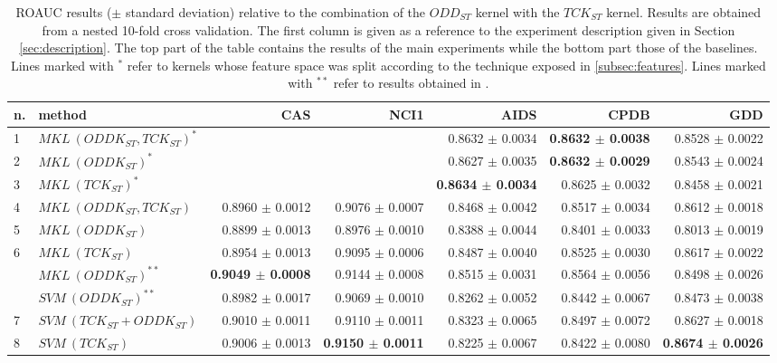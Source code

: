\begin{landscape}

    \begin{table}[ht]\footnotesize
        \centering
        \begin{tabular}{|l|l|r|r|r|r|r|}
            \hline
            n. &method&CAS&NCI1&AIDS&CPDB&GDD\\
            \hline
            1& $MKL~(ODDK_{ST}, TCK_{ST})^*$&&&0.8632 $\pm$ 0.0034&\textbf{0.8632 $\pm$ 0.0038}&0.8528 $\pm$ 0.0022\\
            2& $MKL~(ODDK_{ST})^*$&&&0.8627 $\pm$ 0.0035&\textbf{0.8632 $\pm$  0.0029}&0.8543 $\pm$ 0.0024\\
            3& $MKL~(TCK_{ST})^*$&&&\textbf{0.8634 $\pm$ 0.0034}&0.8625 $\pm$ 0.0032&0.8458 $\pm$ 0.0021\\
            \hline
            4& $MKL~(ODDK_{ST}, TCK_{ST})$&0.8960 $\pm$  0.0012&0.9076 $\pm$ 0.0007&0.8468 $\pm$ 0.0042&0.8517 $\pm$ 0.0034&0.8612 $\pm$ 0.0018\\
            5& $MKL~(ODDK_{ST})$&0.8899 $\pm$ 0.0013&0.8976 $\pm$ 0.0010 &0.8388 $\pm$ 0.0044&0.8401 $\pm$ 0.0033&0.8013 $\pm$ 0.0019\\
            6& $MKL~(TCK_{ST})$&0.8954 $\pm$ 0.0013&0.9095 $\pm$ 0.0006&0.8487 $\pm$ 0.0040&0.8525 $\pm$ 0.0030&0.8617 $\pm$ 0.0022\\
            \hline
             & $MKL~(ODDK_{ST})^{**}$&\textbf{0.9049 $\pm$ 0.0008}&0.9144 $\pm$ 0.0008&0.8515 $\pm$ 0.0031&0.8564 $\pm$ 0.0056&0.8498 $\pm$ 0.0026\\
             & $SVM~(ODDK_{ST})^{**}$&0.8982 $\pm$ 0.0017&0.9069 $\pm$ 0.0010&0.8262 $\pm$ 0.0052&0.8442 $\pm$ 0.0067&0.8473 $\pm$ 0.0038\\
            \hline
            7& $SVM~(TCK_{ST} + ODDK_{ST})$&0.9010 $\pm$ 0.0011&0.9110 $\pm$ 0.0011&0.8323 $\pm$ 0.0065&0.8497 $\pm$ 0.0072&0.8627 $\pm$ 0.0018\\
            8& $SVM~(TCK_{ST})$&0.9006 $\pm$ 0.0013&\textbf{0.9150 $\pm$ 0.0011}&0.8225 $\pm$ 0.0067&0.8422 $\pm$ 0.0080&\textbf{0.8674 $\pm$ 0.0026}\\
            \hline
        \end{tabular}
        \caption{\footnotesize ROAUC results ($\pm$ standard deviation) relative to the combination
            of the $ODD_{ST}$ kernel with the $TCK_{ST}$ kernel. Results are
            obtained from a nested 10-fold cross validation. The first column is
            given as a reference to the experiment description given in Section
            \ref{sec:description}.
            The top part of the table contains the results of the main experiments
            while the bottom part those of the baselines.
            Lines marked with $^*$ refer to kernels whose feature space was split
            according to the technique exposed in \ref{subsec:features}.
            Lines marked with $^{**}$ refer to results obtained in \cite{gmkl}.
        }
        \label{table:results_st}
        \medskip


\end{table}
\end{landscape}
